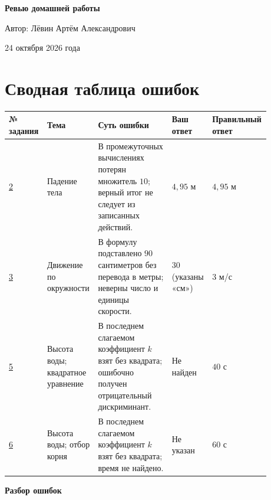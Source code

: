 \documentclass[12pt,a4paper]{article}
\begin{document}
\begin{titlepage}
\thispagestyle{empty}
\begin{center}
\vspace*{0.30\textheight}
{\Huge\bfseries Ревью домашней работы\par}
\vspace{2.7cm}
{\large Автор: Лёвин Артём Александрович\par}
\vspace{0.6cm}
{\large 24 октября 2026 года\par}
\end{center}
\vfill
\begin{center}
\end{center}
\end{titlepage}

\section*{Сводная таблица ошибок}
\footnotesize
\begin{longtable}{@{}L{0.12\linewidth}L{0.17\linewidth}L{0.28\linewidth}L{0.14\linewidth}L{0.17\linewidth}@{}}
\toprule
\textbf{№ задания}&\textbf{Тема}&\textbf{Суть ошибки}&\textbf{Ваш ответ}&\textbf{Правильный ответ}\\
\midrule
\endhead
\hyperref[task:2]{2}&Падение тела&В промежуточных вычислениях потерян множитель $10$; верный итог не следует из записанных действий.&$4{,}95$ м&$4{,}95$ м\\
\hyperref[task:3]{3}&Движение по окружности&В формулу подставлено $90$ сантиметров без перевода в метры; неверны число и единицы скорости.&$30$ (указаны «см»)&$3$ м/с\\
\hyperref[task:5]{5}&Высота воды; квадратное уравнение&В последнем слагаемом коэффициент $k$ взят без квадрата; ошибочно получен отрицательный дискриминант.&Не найден&$40$ с\\
\hyperref[task:6]{6}&Высота воды; отбор корня&В последнем слагаемом коэффициент $k$ взят без квадрата; время не найдено.&Не указан&$60$ с\\
\bottomrule
\end{longtable}
\normalsize

\newpage
\thispagestyle{empty}
\null\vfill
\begin{center}
{\LARGE\bfseries Разбор ошибок}
\end{center}
\vfill\null
\end{document}
